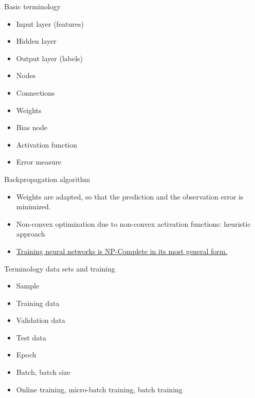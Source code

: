 \documentclass[color=usenames,dvipsnames]{beamer}
\begin{document}
\begin{frame}{Basic terminology} 

\begin{itemize}
\item Input layer (features)
\item Hidden layer
\item Output layer (labels)
\item Nodes
\item Connections
\item Weights
\item Bias node
\item Activation function
\item Error measure
\end{itemize}

\end{frame}





\begin{frame}{Backpropagation algorithm} 

\begin{itemize}
\item Weights are adapted, so that the prediction and the observation error is minimized.\\
\item Non-convex optimization due to non-convex activation functions: heuristic approach\\
\item \href{https://page.mi.fu-berlin.de/rojas/neural/chapter/K10.pdf}{{Training neural networks is NP-Complete in its most general form.}}\\

\end{itemize}

\end{frame}

\begin{frame}{Terminology data sets and training} 

\begin{itemize}
\item Sample
\item Training data
\item Validation data 
\item Test data
\item Epoch
\item Batch, batch size
\item Online training, micro-batch training, batch training
\end{itemize}

\end{frame}
\end{document}

